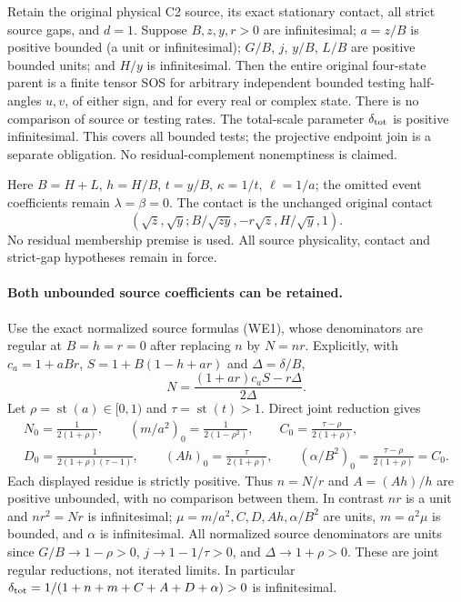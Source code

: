 \label{p99372d145f17:sec:r11-small-r-local}

\begin{theorem}
Retain the original physical C2 source, its exact stationary contact,
all strict source gaps, and $d=1$. Suppose $B,z,y,r>0$ are
infinitesimal; $a=z/B$ is positive bounded (a unit or infinitesimal);
$G/B$, $j$, $y/B$, $L/B$ are positive bounded units; and $H/y$
is infinitesimal.
Then the entire original four-state parent is a finite tensor SOS
for arbitrary independent bounded testing half-angles $u,v$, of either sign, and for every real or complex state.
There is no comparison of source or testing rates.
The total-scale parameter $\delta_{\rm tot}$ is positive infinitesimal.
This covers all bounded tests; the projective endpoint join is a
separate obligation. No residual-complement nonemptiness is claimed.
\end{theorem}

Here $B=H+L$, $h=H/B$, $t=y/B$, $\kappa=1/t$, $\ell=1/a$;
the omitted event coefficients remain $\lambda=\beta=0$.
The contact is the unchanged original contact
\[
 (\sqrt z,\sqrt y;B/\sqrt{zy},-r\sqrt z,H/\sqrt y,1).
\]
No residual membership premise is used. All source physicality,
contact and strict-gap hypotheses remain in force.

\paragraph{Both unbounded source coefficients can be retained.}
Use the exact normalized source formulas (WE1), whose denominators
are regular at $B=h=r=0$ after replacing $n$ by $N=nr$.
Explicitly, with $c_a=1+aBr$, $S=1+B(1-h+ar)$ and
$\Delta=\delta/B$,
\[
 N=\frac{(1+ar)c_aS-r\Delta}{2\Delta}.
\]
Let $\rho=\operatorname{st}(a)\in[0,1)$ and
$\tau=\operatorname{st}(t)>1$. Direct joint reduction gives
\[
\begin{gathered}
 N_0=\frac1{2(1+\rho)},\qquad
 (m/a^2)_0=\frac1{2(1-\rho^2)},\qquad
 C_0=\frac{\tau-\rho}{2(1+\rho)},\\
 D_0=\frac1{2(1+\rho)(\tau-1)},\qquad
 (Ah)_0=\frac\tau{2(1+\rho)},\qquad
 (\alpha/B^2)_0=\frac{\tau-\rho}{2(1+\rho)}=C_0.    \end{gathered}\tag{SL1}
\]
Each displayed residue is strictly positive. Thus $n=N/r$ and
$A=(Ah)/h$ are positive unbounded, with no comparison between
them. In contrast $nr$ is a unit and $nr^2=Nr$ is infinitesimal;
$\mu=m/a^2,C,D,Ah,\alpha/B^2$ are units, $m=a^2\mu$ is
bounded, and $\alpha$ is infinitesimal.
All normalized source denominators are units since
$G/B\to1-\rho>0$, $j\to1-1/\tau>0$, and
$\Delta\to1+\rho>0$. These are joint regular reductions,
not iterated limits. In particular
$\delta_{\rm tot}=1/(1+n+m+C+A+D+\alpha)>0$ is infinitesimal.

